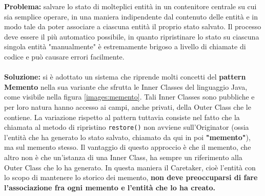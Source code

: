 \documentclass[a4paper,12pt]{report}
\begin{document}
\textbf{Problema:} salvare lo stato di molteplici entità in un contenitore centrale su cui sia semplice operare, in una maniera indipendente dal contenuto delle entità e in modo tale da poter associare a ciascuna entità il proprio stato salvato. Il processo deve essere il più automatico possibile, in quanto ripristinare lo stato su ciascuna singola entità "manualmente" è estremamente brigoso a livello di chiamate di codice e può causare errori facilmente.
\\\\
\textbf{Soluzione:} si è adottato un sistema che riprende molti concetti del \textbf{pattern Memento} nella sua variante che sfrutta le Inner Classes del linguaggio Java, come visibile nella figura \ref{images:memento}. Tali Inner Classes sono pubbliche e per loro natura hanno accesso ai campi, anche privati, della Outer Class che le contiene. La variazione rispetto al pattern tuttavia consiste nel fatto che la chiamata al metodo di ripristino \texttt{restore()} non avviene sull'Originator (ossia l'entità che ha generato lo stato salvato, chiamato da qui in poi \textbf{"memento"}), ma sul memento stesso. Il vantaggio di questo approccio è che il memento, che altro non è che un'istanza di una Inner Class, ha sempre un riferimento alla Outer Class che lo ha generato. In questa maniera il Caretaker, cioè l'entità con lo scopo di mantenere lo storico dei memento, \textbf{non deve preoccuparsi di fare l'associazione fra ogni memento e l'entità che lo ha creato.}
\end{document}
